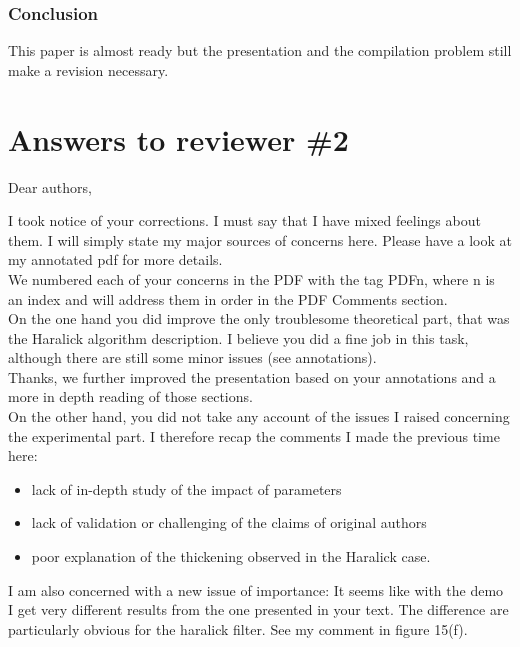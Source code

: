 \documentclass[a4paper,10pt]{report}
\begin{document}
\subsection{ Conclusion}
This paper is almost ready but the presentation and the compilation problem still make a revision necessary.


\chapter{Answers to reviewer \#2}

Dear authors,

\que I took notice of your corrections. I must say that I have mixed feelings
about them. I will simply state my major sources of concerns here. Please
have a look at my annotated pdf for more details.\\
\ans We numbered each of your concerns in the PDF with the tag PDFn, where n is an index and will address them in order in the PDF Comments section.\\

\que On the one hand you did improve the only troublesome theoretical part, that
was  the Haralick algorithm description. I believe you did a fine job in
this task, although there are still some minor issues (see annotations).\\

\ans Thanks, we further improved the presentation based on your annotations and a more in depth reading of those sections.\\

\que On the other hand, you did not take any account of the issues I raised
concerning the experimental part. I therefore recap the comments I made the
previous time here:

\begin{itemize}

\item lack of in-depth study of the impact of parameters

\item lack of validation or challenging of the claims of original authors

\item  poor explanation of the thickening observed in the Haralick case.
\end{itemize} 

\que
I am also concerned with a new issue of importance: It seems like with the
demo I get very different results  from the one presented in your text. The
difference are particularly obvious for the haralick filter. See my comment
in figure 15(f).
\end{document}
